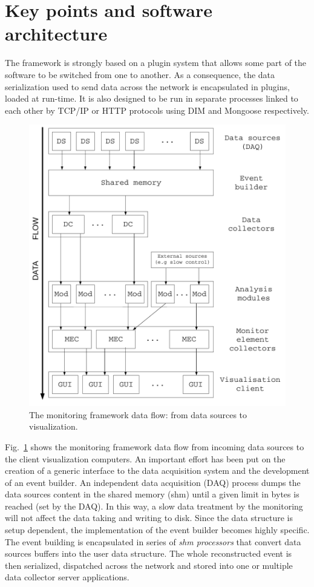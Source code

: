 \documentclass[conference]{IEEEtran}
\begin{document}
\section{Key points and software architecture}

The framework is strongly based on a plugin system that allows some part of the software to be switched from one to another. As a consequence, the data serialization used to send data across the network is encapsulated in plugins, loaded at run-time. It is also designed to be run in separate processes linked to each other by TCP/IP or HTTP protocols using DIM\cite{DIM} and Mongoose\cite{MONGOOSE} respectively. 

\begin{figure}[htbp]
  \begin{center}
    \includegraphics[width=0.9\linewidth]{DQMWorkflow.pdf}
    \caption{\label{DQM_WORKFLOW}The monitoring framework data flow: from data sources to visualization.}    
  \end{center}
\end{figure}


Fig.~\ref{DQM_WORKFLOW} shows the monitoring framework data flow from incoming data sources to the client visualization computers. An important effort has been put on the creation of a generic interface to the data acquisition system and the development of an event builder. An independent data acquisition (DAQ) process dumps the data sources content in the shared memory (shm) until a given limit in bytes is reached (set by the DAQ). In this way, a slow data treatment by the monitoring will not affect the data taking and writing to disk. Since the data structure is setup dependent, the implementation of the event builder becomes highly specific. The event building is encapsulated in series of \textit{shm processors} that convert data sources buffers into the user data structure. The whole reconstructed event is then serialized, dispatched across the network and stored into one or multiple data collector server applications.
\end{document}

